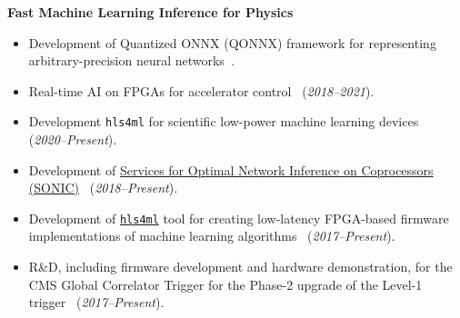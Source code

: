 \documentclass[11pt]{res}
\begin{document}
\begin{resume}
  \textbf{Fast Machine Learning Inference for Physics}
  \begin{itemize}
    \item Development of Quantized ONNX (QONNX) framework for representing arbitrary-precision neural networks~\cite{Pappalardo:2022nxk}.
    \item Real-time AI on FPGAs for accelerator control~\cite{John:2020sak} (\textit{2018--2021}).
    \item Development \texttt{hls4ml} for scientific low-power machine learning devices~\cite{Borras:2022opensource,Banbury:2021mlperf,DiGuglielmo:2021ide,Hawks:2021ruw,Fahim:2021cic} (\textit{2020--Present}).
    \item Development of \href{https://github.com/fastmachinelearning/SonicCMS}{Services for Optimal Network Inference on Coprocessors (SONIC)}~\cite{Krupa:2020bwg,Rankin:2020usv,neurips2019_sonic,Duarte:2019fta} (\textit{2018--Present}).
    \item Development of \href{https://fastmachinelearning.org/hls4ml/}{\texttt{hls4ml}} tool for creating low-latency FPGA-based firmware implementations of machine learning algorithms~\cite{Deiana:2021niw,Elabd:2021lgo,Govorkova:2021utb,Iiyama:2020wap,Heintz:2020soy,DiGuglielmo:2020eqx,Summers:2020xiy,neurips2019_hls4ml,Duarte:2018ite} (\textit{2017--Present}).
    \item R\&D, including firmware development and hardware demonstration, for the CMS Global Correlator Trigger for the Phase-2 upgrade of the Level-1 trigger~\cite{CERN-LHCC-2020-004} (\emph{2017--Present}).
  \end{itemize}

\end{resume}
\end{document}
